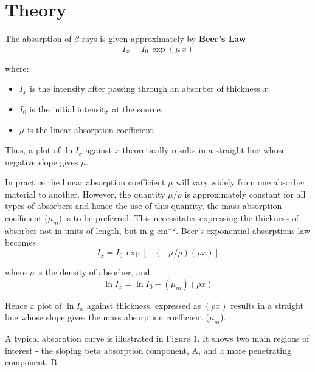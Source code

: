 \section{Theory}

The absorption of $\beta$ rays is given approximately by \textbf{Beer's Law}
\begin{displaymath}
I_x = I_0 \, \exp\left(\mu \, x\right)
\end{displaymath}

where:
\begin{itemize}
\item $I_x$ is the intensity after passing through an absorber of thickness $x$;
\item $I_0$ is the initial intensity at the source;
\item $\mu$ is the linear absorption coefficient.
\end{itemize}

Thus, a plot of $\ln I_x$ against $x$ theoretically results in a straight line whose negative slope gives $\mu$.

In practice the linear absorption coefficient $\mu$ will vary widely from one absorber material to another. However, the quantity $\mu/\rho$ is approximately constant for all types of absorbers and hence the use of this quantity, the mass absorption coefficient ($\mu_m$) is to be preferred. This necessitates expressing the thickness of absorber not in units of length, but in g cm$^{-2}$. Beer's exponential absorptions law becomes
\begin{displaymath}
I_x = I_0 \, \exp \left[-(-\mu/\rho)(\rho x)\right]
\end{displaymath}

where $\rho$ is the density of absorber, and 
\begin{displaymath}
\ln I_x = \ln I_0 - (\mu_m) (\rho x)
\end{displaymath}

Hence a plot of $\ln I_x$ against thickness, expressed as $(\rho x)$ results in a straight line whose slope gives the mass absorption coefficient ($\mu_m$).

A typical absorption curve is illustrated in Figure 1. It shows two main regions of interest - the sloping beta absorption component, A, and a more penetrating component, B.